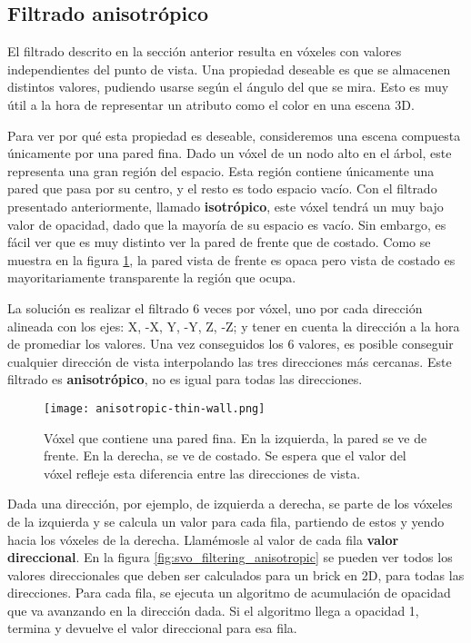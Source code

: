 
\subsection{Filtrado anisotrópico}

El filtrado descrito en la sección anterior resulta en vóxeles con valores independientes del punto de vista.
Una propiedad deseable es que se almacenen distintos valores, pudiendo usarse según el ángulo del que se mira.
Esto es muy útil a la hora de representar un atributo como el color en una escena 3D.

Para ver por qué esta propiedad es deseable, consideremos una escena compuesta únicamente por una pared fina.
Dado un vóxel de un nodo alto en el árbol, este representa una gran región del espacio.
Esta región contiene únicamente una pared que pasa por su centro, y el resto es todo espacio vacío.
Con el filtrado presentado anteriormente, llamado \textbf{isotrópico}, este vóxel tendrá un muy bajo valor de opacidad, dado que la mayoría de su espacio es vacío.
Sin embargo, es fácil ver que es muy distinto ver la pared de frente que de costado.
Como se muestra en la figura \ref{fig:anisotropic-thin-wall}, la pared vista de frente es opaca pero vista de costado es mayoritariamente transparente la región que ocupa.

La solución es realizar el filtrado 6 veces por vóxel, uno por cada dirección alineada con los ejes: X, -X, Y, -Y, Z, -Z; y tener en cuenta la dirección a la hora de promediar los valores.
Una vez conseguidos los 6 valores, es posible conseguir cualquier dirección de vista interpolando las tres direcciones más cercanas.
Este filtrado es \textbf{anisotrópico}, no es igual para todas las direcciones.

\begin{figure}
    \centering
    \texttt{[image: anisotropic-thin-wall.png]}
    \caption{
        Vóxel que contiene una pared fina.
        En la izquierda, la pared se ve de frente.
        En la derecha, se ve de costado.
        Se espera que el valor del vóxel refleje esta diferencia entre las direcciones de vista.
    }
    \label{fig:anisotropic-thin-wall}
\end{figure}

Dada una dirección, por ejemplo, de izquierda a derecha, se parte de los vóxeles de la izquierda y se calcula un valor para cada fila, partiendo de estos y yendo hacia los vóxeles de la derecha.
Llamémosle al valor de cada fila \textbf{valor direccional}.
En la figura \ref{fig:svo_filtering_anisotropic} se pueden ver todos los valores direccionales que deben ser calculados para un brick en 2D, para todas las direcciones.
Para cada fila, se ejecuta un algoritmo de acumulación de opacidad que va avanzando en la dirección dada.
Si el algoritmo llega a opacidad 1, termina y devuelve el valor direccional para esa fila.

